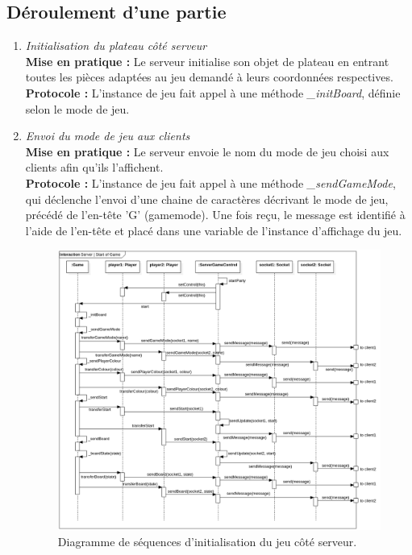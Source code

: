 \documentclass[10pt, a4paper]{article}
\begin{document}
\subsection{Déroulement d'une partie}
\begin{enumerate}

\item \textit{Initialisation du plateau côté serveur}\\
\textbf{Mise en pratique :} Le serveur initialise son objet de plateau en entrant toutes les pièces adaptées au jeu demandé à leurs coordonnées respectives.\\
\textbf{Protocole :} L'instance de jeu fait appel à une méthode \textit{\_initBoard}, définie selon le mode de jeu.

\item \textit{Envoi du mode de jeu aux clients}\\
\textbf{Mise en pratique :} Le serveur envoie le nom du mode de jeu choisi aux clients afin qu'ils l'affichent.\\
\textbf{Protocole :} L'instance de jeu fait appel à une méthode \textit{\_sendGameMode}, qui déclenche l'envoi d'une chaine de caractères décrivant le mode de jeu, précédé de l'en-tête 'G' (gamemode). Une fois reçu, le message est identifié à l'aide de l'en-tête et placé dans une variable de l'instance d'affichage du jeu.

\begin{figure} [ht]
\centering
\includegraphics[scale=0.40]{Sequence_Server_GameStart.png}
\caption{Diagramme de séquences d'initialisation du jeu côté serveur.}
\end{figure}


\end{enumerate}
\end{document}

